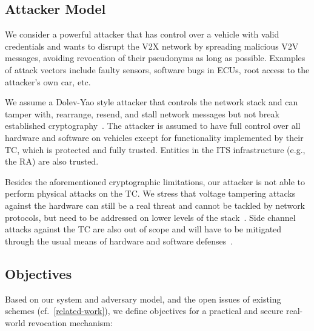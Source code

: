 \subsection{Attacker Model}
\label{section:attacker-model}

We consider a powerful attacker that has control over a vehicle with valid
credentials and wants to disrupt the \ac{V2X} network by spreading malicious
\ac{V2V} messages, avoiding revocation of their pseudonyms as long as possible.
Examples of attack vectors include faulty sensors, software bugs in \acp{ECU}, root
access to the attacker's own car, etc.

We assume a Dolev-Yao style attacker that controls the network stack and can
tamper with, rearrange, resend, and stall network messages but not break
established cryptography~\cite{dolev1983security}. The attacker is assumed to
have full control over all hardware and software on vehicles except for
functionality implemented by their \ac{TC}, which is protected and fully
trusted. Entities in the \ac{ITS} infrastructure (e.g., the \ac{RA}) are also
trusted.

Besides the aforementioned cryptographic limitations, our attacker is not able
to perform physical attacks on the \ac{TC}.
We stress that voltage tampering attacks against the hardware can still be a
real threat and cannot be tackled by network protocols, but need to be addressed
on lower levels of the stack~\cite{chen2021voltpillager,
murdock2020plundervolt}. Side channel attacks against the \ac{TC} are also out
of scope and will have to be mitigated through the usual means of hardware and
software defenses~\cite{lou2021survey, canella2019systematic}.

\subsection{Objectives}
\label{section:system-objectives}

Based on our system and adversary model, and the open issues of existing schemes
(cf.~\cref{related-work}), we define objectives for a practical and secure
real-world revocation mechanism:

